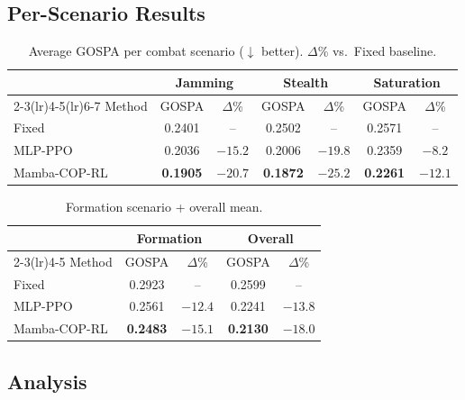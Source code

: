 \documentclass[conference]{IEEEtran}
\begin{document}
\subsection{Per-Scenario Results}

\begin{table}[t]
  \centering
  \caption{Average GOSPA per combat scenario ($\downarrow$ better).
           $\Delta$\% vs.\ Fixed baseline.}
  \label{tab:results}
  \setlength{\tabcolsep}{3pt}
  \begin{tabular}{lcccccc}
    \toprule
    & \multicolumn{2}{c}{Jamming}
    & \multicolumn{2}{c}{Stealth}
    & \multicolumn{2}{c}{Saturation} \\
    \cmidrule(lr){2-3}\cmidrule(lr){4-5}\cmidrule(lr){6-7}
    Method & GOSPA & $\Delta$\%
           & GOSPA & $\Delta$\%
           & GOSPA & $\Delta$\% \\
    \midrule
    Fixed        & 0.2401 & --      & 0.2502 & --      & 0.2571 & -- \\
    MLP-PPO      & 0.2036 & $-15.2$ & 0.2006 & $-19.8$ & 0.2359 & $-8.2$ \\
    Mamba-COP-RL & \textbf{0.1905} & $\mathbf{-20.7}$ & \textbf{0.1872} & $\mathbf{-25.2}$ & \textbf{0.2261} & $\mathbf{-12.1}$ \\
    \bottomrule
  \end{tabular}
\end{table}

\begin{table}[t]
  \centering
  \caption{Formation scenario + overall mean.}
  \label{tab:results2}
  \begin{tabular}{lcccc}
    \toprule
    & \multicolumn{2}{c}{Formation}
    & \multicolumn{2}{c}{Overall} \\
    \cmidrule(lr){2-3}\cmidrule(lr){4-5}
    Method & GOSPA & $\Delta$\%
           & GOSPA & $\Delta$\% \\
    \midrule
    Fixed        & 0.2923 & --      & 0.2599 & -- \\
    MLP-PPO      & 0.2561 & $-12.4$ & 0.2241 & $-13.8$ \\
    Mamba-COP-RL & \textbf{0.2483} & $\mathbf{-15.1}$ & \textbf{0.2130} & $\mathbf{-18.0}$ \\
    \bottomrule
  \end{tabular}
\end{table}

\subsection{Analysis}
\end{document}
